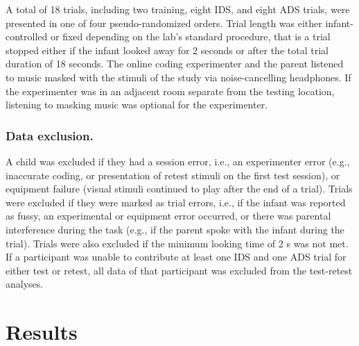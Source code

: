 \documentclass[
  man,floatsintext]{apa6}
\begin{document}
A total of 18 trials, including two training, eight IDS, and eight ADS trials, were presented in one of four pseudo-randomized orders. Trial length was either infant-controlled or fixed depending on the lab's standard procedure, that is a trial stopped either if the infant looked away for 2 seconds or after the total trial duration of 18 seconds. The online coding experimenter and the parent listened to music masked with the stimuli of the study via noise-cancelling headphones. If the experimenter was in an adjacent room separate from the testing location, listening to masking music was optional for the experimenter.

\hypertarget{data-exclusion.}{%
\subsubsection{Data exclusion.}\label{data-exclusion.}}

A child was excluded if they had a session error, i.e., an experimenter error (e.g., inaccurate coding, or presentation of retest stimuli on the first test session), or equipment failure (visual stimuli continued to play after the end of a trial). Trials were excluded if they were marked as trial errors, i.e., if the infant was reported as fussy, an experimental or equipment error occurred, or there was parental interference during the task (e.g., if the parent spoke with the infant during the trial). Trials were also excluded if the minimum looking time of 2 s was not met. If a participant was unable to contribute at least one IDS and one ADS trial for either test or retest, all data of that participant was excluded from the test-retest analyses.

\hypertarget{results}{%
\section{Results}\label{results}}
\end{document}
